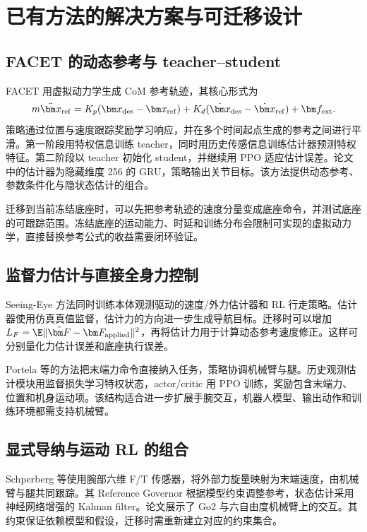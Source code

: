 \section{已有方法的解决方案与可迁移设计}
\subsection{FACET 的动态参考与 teacher--student}
FACET 用虚拟动力学生成 CoM 参考轨迹，其核心形式为
\begin{equation}
 m\ddot{\bm x}_{\rm ref}=K_p(\bm x_{\rm des}-\bm x_{\rm ref})
 +K_d(\dot{\bm x}_{\rm des}-\dot{\bm x}_{\rm ref})+\bm f_{\rm ext}.
\end{equation}
策略通过位置与速度跟踪奖励学习响应，并在多个时间起点生成的参考之间进行平滑。第一阶段用特权信息训练 teacher，同时用历史传感信息训练估计器预测特权特征。第二阶段以 teacher 初始化 student，并继续用 PPO 适应估计误差。论文中的估计器为隐藏维度 256 的 GRU，策略输出关节目标。该方法提供动态参考、参数条件化与隐状态估计的组合。\cite{facet2025}

迁移到当前冻结底座时，可以先把参考轨迹的速度分量变成底座命令，并测试底座的可跟踪范围。冻结底座的运动能力、时延和训练分布会限制可实现的虚拟动力学，直接替换参考公式的收益需要闭环验证。

\subsection{监督力估计与直接全身力控制}
Seeing-Eye 方法同时训练本体观测驱动的速度/外力估计器和 RL 行走策略。估计器使用仿真真值监督，估计力的方向进一步生成导航目标。迁移时可以增加
$L_F=\E\|\hat{\bm F}-\bm F_{\rm applied}\|^2$，再将估计力用于计算动态参考速度修正。这样可分别量化力估计误差和底座执行误差。\cite{defazio2023}

Portela 等的方法把末端力命令直接纳入任务，策略协调机械臂与腿。历史观测估计模块用监督损失学习特权状态，actor/critic 用 PPO 训练，奖励包含末端力、位置和机身运动项。该结构适合进一步扩展手腕交互，机器人模型、输出动作和训练环境都需支持机械臂。\cite{portela2024}

\subsection{显式导纳与运动 RL 的组合}
Schperberg 等使用腕部六维 F/T 传感器，将外部力旋量映射为末端速度，由机械臂与腿共同跟踪。其 Reference Governor 根据模型约束调整参考，状态估计采用神经网络增强的 Kalman filter。论文展示了 Go2 与六自由度机械臂上的交互。其约束保证依赖模型和假设，迁移时需重新建立对应的约束集合。\cite{schperberg2026}

